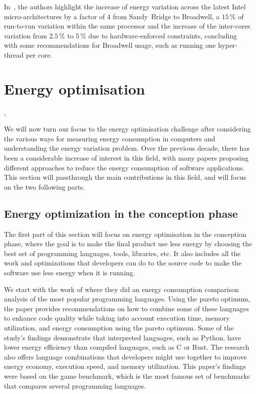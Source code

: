 In~\cite{marathe_empirical_2017_m}, the authors highlight the increase of energy variation across the latest Intel micro-architectures by a factor of $4$ from Sandy~Bridge to Broadwell, a $15\,\%$ of run-to-run variation within the same processor and the increase of the inter-cores variation from $2.5\,\%$ to $5\,\%$ due to hardware-enforced constraints, concluding with some recommendations for Broadwell usage, such as running one hyper-thread per core.

\section{Energy optimisation}\label{section:soa_energyoptimization},

We will now turn our focus to the energy optimisation challenge after considering the various ways for measuring energy consumption in computers and understanding the energy variation problem.
Over the previous decade, there has been a considerable increase of interest in this field, with many papers proposing different approaches to reduce the energy consumption of software applications. This section will passthrough the main contributions in this field, and will focus on the two following parts.

\subsection{Energy optimization in the conception phase}
The first part of this section will focus on energy optimisation in the conception phase, where the goal is to make the final product use less energy by choosing the best set of programming languages, tools, libraries, etc. It also includes all the work and optimizations that developers can do to the source code to make the software use less energy when it is running.

We start with the work of \citeauthor{pereira_energy_2017} where they  did an energy consumption comparison analysis of the most popular programming languages.
Using the pareto optimum, the paper  provides recommendations on how to combine some of these languages to enhance code quality while taking into account execution time, memory utilization, and energy consumption using the pareto optimum. Some of the study's findings demonstrate that interpreted languages, such as Python, have lower energy efficiency than compiled languages, such as C or Rust. The research also offers language combinations that developers might use together to improve energy economy, execution speed, and memory utilization.
This paper's findings were based on the game benchmark, which is the most famous set of benchmarks that compares several programming languages.


